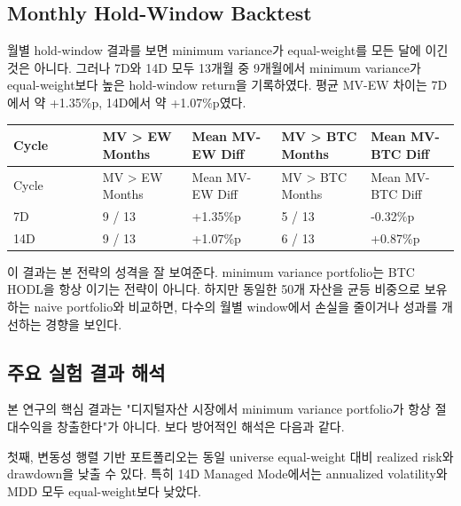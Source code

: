 \documentclass[12pt,a4paper]{article}
\begin{document}


\subsection{Monthly Hold-Window Backtest}

월별 hold-window 결과를 보면 minimum variance가 equal-weight를 모든 달에 이긴 것은 아니다. 그러나 7D와 14D 모두 13개월 중 9개월에서 minimum variance가 equal-weight보다 높은 hold-window return을 기록하였다. 평균 MV-EW 차이는 7D에서 약 +1.35\%p, 14D에서 약 +1.07\%p였다.

\begin{center}
\scriptsize
\begin{longtable}{@{}p{0.20\linewidth}p{0.20\linewidth}p{0.20\linewidth}p{0.20\linewidth}p{0.20\linewidth}@{}}
\toprule
Cycle & MV > EW Months & Mean MV-EW Diff & MV > BTC Months & Mean MV-BTC Diff \\
\midrule
\endfirsthead
\toprule
Cycle & MV > EW Months & Mean MV-EW Diff & MV > BTC Months & Mean MV-BTC Diff \\
\midrule
\endhead
7D & 9 / 13 & +1.35\%p & 5 / 13 & -0.32\%p \\
14D & 9 / 13 & +1.07\%p & 6 / 13 & +0.87\%p \\
\bottomrule
\end{longtable}
\end{center}

이 결과는 본 전략의 성격을 잘 보여준다. minimum variance portfolio는 BTC HODL을 항상 이기는 전략이 아니다. 하지만 동일한 50개 자산을 균등 비중으로 보유하는 naive portfolio와 비교하면, 다수의 월별 window에서 손실을 줄이거나 성과를 개선하는 경향을 보인다.


\subsection{주요 실험 결과 해석}

본 연구의 핵심 결과는 "디지털자산 시장에서 minimum variance portfolio가 항상 절대수익을 창출한다"가 아니다. 보다 방어적인 해석은 다음과 같다.

첫째, 변동성 행렬 기반 포트폴리오는 동일 universe equal-weight 대비 realized risk와 drawdown을 낮출 수 있다. 특히 14D Managed Mode에서는 annualized volatility와 MDD 모두 equal-weight보다 낮았다.
\end{document}
